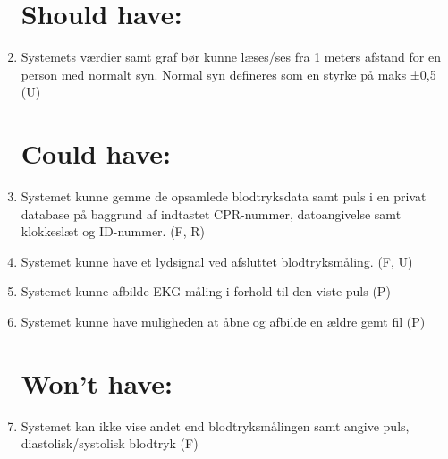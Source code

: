 \begin{enumerate}[4.1]
\section{Should have:}
		\item Systemets værdier samt graf bør kunne læses/ses fra 1 meters afstand for en person med normalt syn. Normal syn defineres som en styrke på maks ±0,5 (U)
	
\section{Could have:}
	\item Systemet kunne gemme de opsamlede blodtryksdata samt puls i en privat database på baggrund af indtastet CPR-nummer, datoangivelse samt klokkeslæt og ID-nummer. (F, R)
	\item Systemet kunne have et lydsignal ved afsluttet blodtryksmåling. (F, U)
	\item Systemet kunne afbilde EKG-måling i forhold til den viste puls (P)
	\item Systemet kunne have muligheden at åbne og afbilde en ældre gemt fil (P)

\section{Won't have:}
	\item Systemet kan ikke vise andet end blodtryksmålingen samt angive puls, diastolisk/systolisk blodtryk (F) 
\end{enumerate}